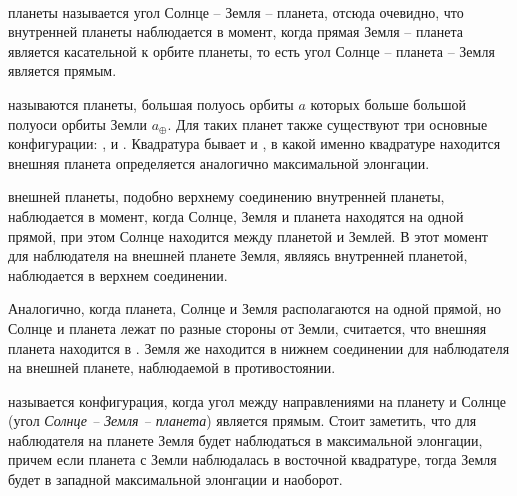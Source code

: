 \begin{minipage}{0.63\tw}
\end{minipage}\\

 планеты называется угол Солнце -- Земля -- планета, отсюда очевидно, что  внутренней планеты наблюдается в момент, когда прямая Земля -- планета является касательной к орбите планеты, то есть угол Солнце -- планета -- Земля является прямым.

 называются планеты, большая полуось орбиты $a$ которых больше большой полуоси орбиты Земли $a_\oplus$. Для таких планет также существуют три основные конфигурации: ,  и . Квадратура бывает  и , в какой именно квадратуре находится внешняя планета определяется аналогично максимальной элонгации.

 внешней планеты, подобно верхнему соединению внутренней планеты, наблюдается в момент, когда Солнце, Земля и планета находятся на одной прямой, при этом Солнце находится между планетой и Землей. В этот момент для наблюдателя на внешней планете Земля, являясь внутренней планетой, наблюдается в верхнем соединении.

Аналогично, когда планета, Солнце и Земля располагаются на одной прямой, но Солнце и планета лежат по разные стороны от Земли, считается, что внешняя планета находится в . Земля же находится в нижнем соединении для наблюдателя на внешней планете, наблюдаемой в противостоянии.

 называется конфигурация, когда угол между направлениями на планету и Солнце (угол {\slshape Солнце -- Земля -- планета}) является прямым. Стоит заметить, что для наблюдателя на планете Земля будет наблюдаться в максимальной элонгации, причем если планета с Земли наблюдалась в восточной квадратуре, тогда Земля будет в западной максимальной элонгации и наоборот.

